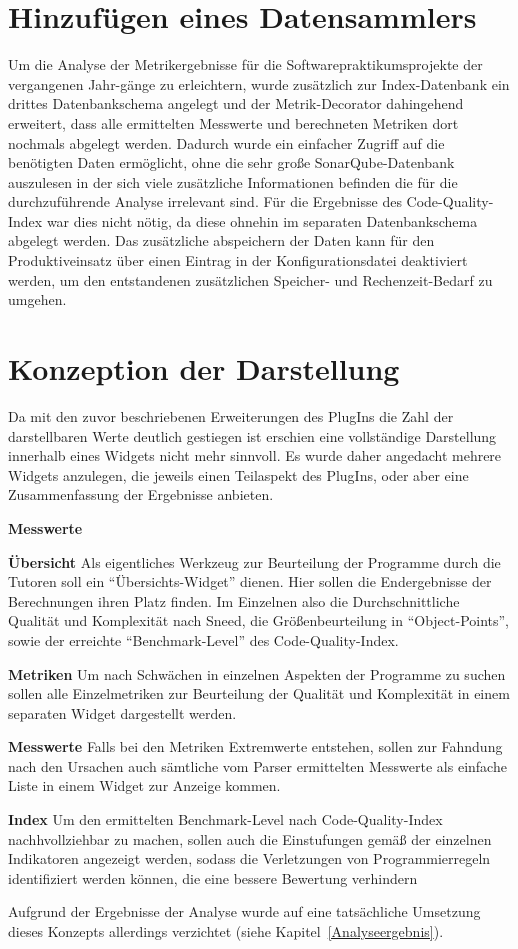 \documentclass[da,ngerman]{stthesis}
\begin{document}
		\section{Hinzufügen eines Datensammlers}
  			Um die Analyse der Metrikergebnisse für die Softwarepraktikumsprojekte der vergangenen Jahr-gänge zu erleichtern, wurde zusätzlich zur Index-Datenbank ein drittes Datenbankschema angelegt und der Metrik-Decorator dahingehend erweitert, dass alle ermittelten Messwerte und berechneten Metriken dort nochmals abgelegt werden. Dadurch wurde ein einfacher Zugriff auf die benötigten Daten ermöglicht, ohne die sehr große SonarQube-Datenbank auszulesen in der sich viele zusätzliche Informationen befinden die für die durchzuführende Analyse irrelevant sind. Für die Ergebnisse des Code-Quality-Index war dies nicht nötig, da diese ohnehin im separaten Datenbankschema abgelegt werden. Das zusätzliche abspeichern der Daten kann für den Produktiveinsatz über einen Eintrag in der Konfigurationsdatei deaktiviert werden, um den entstandenen zusätzlichen Speicher- und Rechenzeit-Bedarf zu umgehen.
  		\section{Konzeption der Darstellung}
  			Da mit den zuvor beschriebenen Erweiterungen des PlugIns die Zahl der darstellbaren Werte deutlich gestiegen ist erschien eine vollständige Darstellung innerhalb eines Widgets nicht mehr sinnvoll. Es wurde daher angedacht mehrere Widgets anzulegen, die jeweils einen Teilaspekt des PlugIns, oder aber eine Zusammenfassung der Ergebnisse anbieten.
  			\begin{labeling}{\textbf{Messwerte}}
				\item [\textbf{Übersicht}] Als eigentliches Werkzeug zur Beurteilung der Programme durch die Tutoren soll ein "`Übersichts-Widget"' dienen. Hier sollen die Endergebnisse der Berechnungen ihren Platz finden. Im Einzelnen also die Durchschnittliche Qualität und Komplexität nach Sneed, die Größenbeurteilung in "`Object-Points"', sowie der erreichte "`Benchmark-Level"' des Code-Quality-Index.
				\item [\textbf{Metriken}] Um nach Schwächen in einzelnen Aspekten der Programme zu suchen sollen alle Einzelmetriken zur Beurteilung der Qualität und Komplexität in einem separaten Widget dargestellt werden.
				\item [\textbf{Messwerte}] Falls bei den Metriken Extremwerte entstehen, sollen zur Fahndung nach den Ursachen auch sämtliche vom Parser ermittelten Messwerte als einfache Liste in einem Widget zur Anzeige kommen.
				\item [\textbf{Index}] Um den ermittelten Benchmark-Level nach Code-Quality-Index nachhvollziehbar zu machen, sollen auch die Einstufungen gemäß der einzelnen Indikatoren angezeigt werden, sodass die Verletzungen von Programmierregeln identifiziert werden können, die eine bessere Bewertung verhindern
			\end{labeling}
  			Aufgrund der Ergebnisse der Analyse wurde auf eine tatsächliche Umsetzung dieses Konzepts allerdings verzichtet (siehe Kapitel~\ref{Analyseergebnis}).
\end{document}
